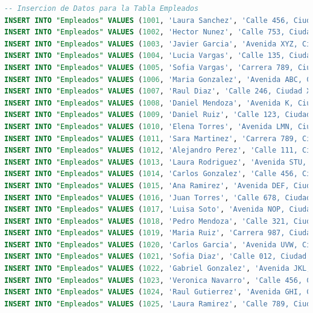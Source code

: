 \documentclass[12pt]{article}
\begin{document}
\begin{lstlisting}[language=SQL]
-- Insercion de Datos para la Tabla Empleados
INSERT INTO "Empleados" VALUES (1001, 'Laura Sanchez', 'Calle 456, Ciudad C', '555-1111', 'Asesor');
INSERT INTO "Empleados" VALUES (1002, 'Hector Nunez', 'Calle 753, Ciudad XYZ', '555-4545', 'Asesor');
INSERT INTO "Empleados" VALUES (1003, 'Javier Garcia', 'Avenida XYZ, Ciudad B', '555-2222', 'Mecanico');
INSERT INTO "Empleados" VALUES (1004, 'Lucia Vargas', 'Calle 135, Ciudad XYZ', '555-7777', 'Mecanico');
INSERT INTO "Empleados" VALUES (1005, 'Sofia Vargas', 'Carrera 789, Ciudad A', '555-3333', 'Promotor');
INSERT INTO "Empleados" VALUES (1006, 'Maria Gonzalez', 'Avenida ABC, Ciudad XYZ', '555-5678', 'Promotor');
INSERT INTO "Empleados" VALUES (1007, 'Raul Diaz', 'Calle 246, Ciudad XYZ', '555-6666', 'Promotor');
INSERT INTO "Empleados" VALUES (1008, 'Daniel Mendoza', 'Avenida K, Ciudad P', '888888888', 'Promotor');
INSERT INTO "Empleados" VALUES (1009, 'Daniel Ruiz', 'Calle 123, Ciudad A', '555-4444', 'Electromecanico');
INSERT INTO "Empleados" VALUES (1010, 'Elena Torres', 'Avenida LMN, Ciudad B', '555-5555', 'Gerente');
INSERT INTO "Empleados" VALUES (1011, 'Sara Martinez', 'Carrera 789, Ciudad XYZ', '555-9999', 'Asesor');
INSERT INTO "Empleados" VALUES (1012, 'Alejandro Perez', 'Calle 111, Ciudad P', '888877777', 'Mecanico');
INSERT INTO "Empleados" VALUES (1013, 'Laura Rodriguez', 'Avenida STU, Ciudad XYZ', '555-0000', 'Promotor');
INSERT INTO "Empleados" VALUES (1014, 'Carlos Gonzalez', 'Calle 456, Ciudad A', '555-1234', 'Promotor');
INSERT INTO "Empleados" VALUES (1015, 'Ana Ramirez', 'Avenida DEF, Ciudad XYZ', '555-9876', 'Electromecanico');
INSERT INTO "Empleados" VALUES (1016, 'Juan Torres', 'Calle 678, Ciudad XYZ', '555-1111', 'Gerente');
INSERT INTO "Empleados" VALUES (1017, 'Luisa Soto', 'Avenida NOP, Ciudad A', '555-2222', 'Asesor');
INSERT INTO "Empleados" VALUES (1018, 'Pedro Mendoza', 'Calle 321, Ciudad XYZ', '555-3333', 'Mecanico');
INSERT INTO "Empleados" VALUES (1019, 'Maria Ruiz', 'Carrera 987, Ciudad A', '555-4444', 'Promotor');
INSERT INTO "Empleados" VALUES (1020, 'Carlos Garcia', 'Avenida UVW, Ciudad XYZ', '555-5555', 'Promotor');
INSERT INTO "Empleados" VALUES (1021, 'Sofia Diaz', 'Calle 012, Ciudad XYZ', '555-6666', 'Promotor');
INSERT INTO "Empleados" VALUES (1022, 'Gabriel Gonzalez', 'Avenida JKL, Ciudad P', '888888888', 'Promotor');
INSERT INTO "Empleados" VALUES (1023, 'Veronica Navarro', 'Calle 456, Ciudad A', '555-7777', 'Electromecanico');
INSERT INTO "Empleados" VALUES (1024, 'Raul Gutierrez', 'Avenida GHI, Ciudad XYZ', '555-8888', 'Gerente');
INSERT INTO "Empleados" VALUES (1025, 'Laura Ramirez', 'Calle 789, Ciudad XYZ', '555-9999', 'Asesor');

\end{lstlisting}
\end{document}
